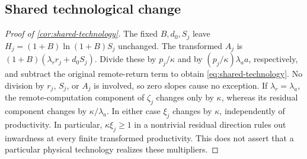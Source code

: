 \subsection{Shared technological change}
\label{app:shared-technology-proof}
\begin{proof}[Proof of \cref{cor:shared-technology}]
The fixed $B,d_0,S_j$ leave $H_j=(1+B)\ln(1+B)S_j$ unchanged.
The transformed $A_j$ is $(1+B)(\lambda_r r_j+d_0S_j)$.
Divide these by $p_j/\kappa$ and by
$(p_j/\kappa)\lambda_a a$, respectively, and subtract the original
remote-return term to obtain \cref{eq:shared-technology}.
No division by $r_j$, $S_j$, or $A_j$ is involved, so zero slopes cause
no exception. If $\lambda_r=\lambda_a$, the remote-computation component
of $\zeta_j$ changes only by $\kappa$, whereas its residual component
changes by $\kappa/\lambda_a$. In either case $\xi_j$ changes by
$\kappa$, independently of productivity. In particular,
$\kappa\xi_j\geq1$ in a nontrivial residual direction rules out inwardness
at every finite transformed productivity. This does not assert that a
particular physical technology realizes these multipliers.
\end{proof}

